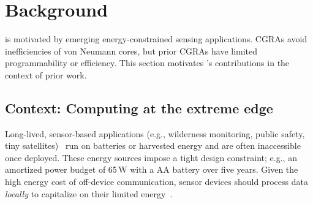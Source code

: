 \section{Background}
\label{sec:background}

\tabRipTideSnippets

\riptide is motivated by emerging energy-constrained sensing applications.
%
CGRAs avoid inefficiencies of von Neumann cores,
but prior CGRAs have limited programmability or efficiency.
%
This section motivates \riptide's contributions in the context of prior work.

\subsection{Context: Computing at the extreme edge}

Long-lived, sensor-based applications (e.g., wilderness monitoring, public safety, tiny
satellites)~\cite{snapl2017,denby2020orbital} run on batteries or harvested
energy and are often inaccessible once deployed.
%
These energy sources impose a tight design constraint;
e.g., an amortized power budget of 65\,\textmu W with a AA battery
over five years.   
%
Given the high energy cost of off-device communication,
sensor devices should process data \emph{locally} to capitalize
on their limited energy~\cite{sonic}.
%
%
%
%
%
%
%

